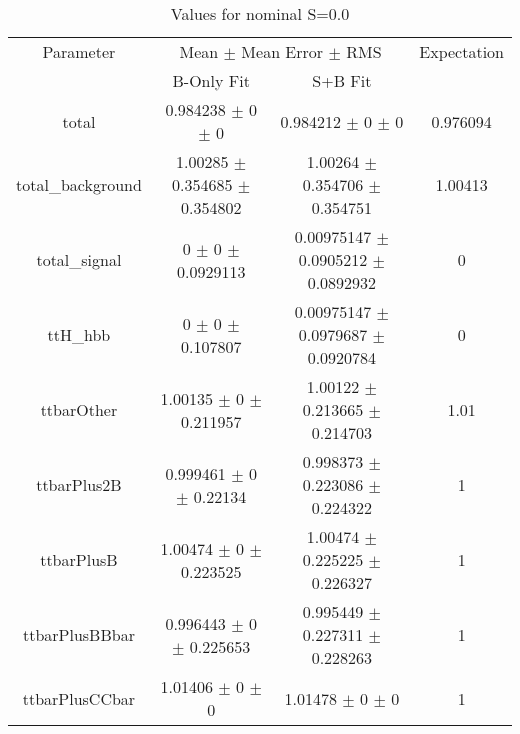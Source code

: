 \begin{table}
\centering
\caption{Values for nominal S=0.0}
\begin{tabular}{cccc}
\toprule
Parameter & \multicolumn{2}{c}{Mean $\pm$ Mean Error $\pm$ RMS} & Expectation\\
 & B-Only Fit & S+B Fit & \\
\midrule
total & \num{0.984238} $\pm$ \num{0} $\pm$ \num{0} & \num{0.984212} $\pm$ \num{0} $\pm$ \num{0} & \num{0.976094}\\
total\_background & \num{1.00285} $\pm$ \num{0.354685} $\pm$ \num{0.354802} & \num{1.00264} $\pm$ \num{0.354706} $\pm$ \num{0.354751} & \num{1.00413}\\
total\_signal & \num{0} $\pm$ \num{0} $\pm$ \num{0.0929113} & \num{0.00975147} $\pm$ \num{0.0905212} $\pm$ \num{0.0892932} & \num{0}\\
ttH\_hbb & \num{0} $\pm$ \num{0} $\pm$ \num{0.107807} & \num{0.00975147} $\pm$ \num{0.0979687} $\pm$ \num{0.0920784} & \num{0}\\
ttbarOther & \num{1.00135} $\pm$ \num{0} $\pm$ \num{0.211957} & \num{1.00122} $\pm$ \num{0.213665} $\pm$ \num{0.214703} & \num{1.01}\\
ttbarPlus2B & \num{0.999461} $\pm$ \num{0} $\pm$ \num{0.22134} & \num{0.998373} $\pm$ \num{0.223086} $\pm$ \num{0.224322} & \num{1}\\
ttbarPlusB & \num{1.00474} $\pm$ \num{0} $\pm$ \num{0.223525} & \num{1.00474} $\pm$ \num{0.225225} $\pm$ \num{0.226327} & \num{1}\\
ttbarPlusBBbar & \num{0.996443} $\pm$ \num{0} $\pm$ \num{0.225653} & \num{0.995449} $\pm$ \num{0.227311} $\pm$ \num{0.228263} & \num{1}\\
ttbarPlusCCbar & \num{1.01406} $\pm$ \num{0} $\pm$ \num{0} & \num{1.01478} $\pm$ \num{0} $\pm$ \num{0} & \num{1}\\
\bottomrule
\end{tabular}
\end{table}